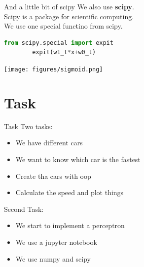 \documentclass{beamer}
\begin{document}
\begin{frame}[fragile]{And a little bit of scipy}
    We also use \textbf{scipy}.\\
    Scipy is a package for scientific computing.\\\pause
    We use one special functino from scipy.\\\pause
    \begin{lstlisting}[language=Python, backgroundcolor = \color{lightgray}]
        from scipy.special import expit
        expit(w1_t*x+w0_t)
    \end{lstlisting}
    \begin{center}
        \texttt{[image: figures/sigmoid.png]}
    \end{center}
\end{frame}
    

\section{Task}

\begin{frame}{Task}
    Two tasks:
    \begin{itemize}
        \item We have different cars
        \item We want to know which car is the fastest
        \item Create tha cars with oop
        \item Calculate the speed and plot things
    \end{itemize}
    \pause Second Task:
    \begin{itemize}
        \item We start to implement a perceptron
        \item We use a jupyter notebook
        \item We use numpy and scipy
    \end{itemize}
\end{frame}
\end{document}
